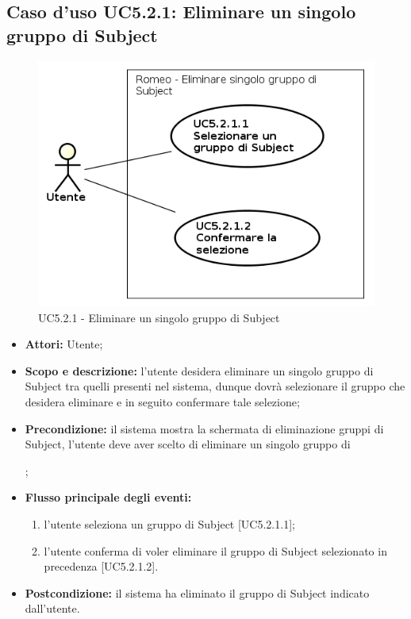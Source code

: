 \subsection{Caso d'uso UC5.2.1: Eliminare un singolo gruppo di Subject}
\begin{figure}[!h]
\begin{center}
\includegraphics[scale=0.6]{./img/Use_Case/UC5_2_1}
\caption{UC5.2.1 - Eliminare un singolo gruppo di Subject}
\end{center}
\end{figure}
\begin{itemize}
\item \textbf{Attori:} Utente;
\item \textbf{Scopo e descrizione:} l'utente desidera eliminare un singolo gruppo di Subject\glossario{} tra quelli presenti nel sistema, dunque dovrà selezionare il gruppo che desidera eliminare e in seguito confermare tale selezione;
\item \textbf{Precondizione:} il sistema mostra la schermata di eliminazione gruppi di Subject\glossario{}, l'utente deve aver scelto di eliminare un singolo gruppo di \subject{};
\item \textbf{Flusso principale degli eventi:}
\begin{enumerate}
\item l'utente seleziona un gruppo di Subject\glossario{} [UC5.2.1.1];
\item l'utente conferma di voler eliminare il gruppo di Subject\glossario{} selezionato in precedenza [UC5.2.1.2].
\end{enumerate}
\item \textbf{Postcondizione:} il sistema ha eliminato il gruppo di Subject\glossario{} indicato dall'utente.
\end{itemize}

